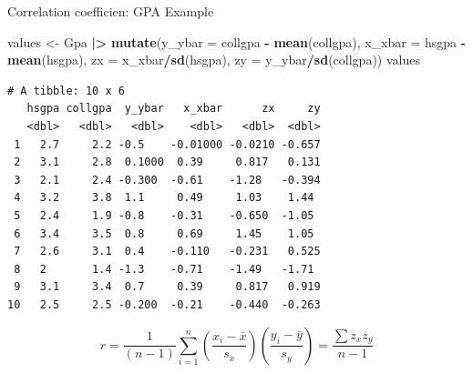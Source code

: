 \documentclass[
  ignorenonframetext,
]{beamer}
\newenvironment{Shaded}{\begin{snugshade}}{\end{snugshade}}
\newcommand{\AttributeTok}[1]{\textcolor[rgb]{0.13,0.29,0.53}{#1}}
\newcommand{\FunctionTok}[1]{\textcolor[rgb]{0.13,0.29,0.53}{\textbf{#1}}}
\newcommand{\NormalTok}[1]{#1}
\newcommand{\OtherTok}[1]{\textcolor[rgb]{0.56,0.35,0.01}{#1}}
\newcommand{\SpecialCharTok}[1]{\textcolor[rgb]{0.81,0.36,0.00}{\textbf{#1}}}
\begin{document}
\begin{frame}[fragile]{Correlation coefficien: GPA Example}
\label{correlation-coefficien-gpa-example-1}
\small

\begin{Shaded}
\begin{Highlighting}[]
\NormalTok{values }\OtherTok{\textless{}{-}}\NormalTok{ Gpa }\SpecialCharTok{|\textgreater{}} 
  \FunctionTok{mutate}\NormalTok{(}\AttributeTok{y\_ybar =}\NormalTok{ collgpa }\SpecialCharTok{{-}} \FunctionTok{mean}\NormalTok{(collgpa), }
         \AttributeTok{x\_xbar =}\NormalTok{ hsgpa }\SpecialCharTok{{-}} \FunctionTok{mean}\NormalTok{(hsgpa),}
         \AttributeTok{zx =}\NormalTok{ x\_xbar}\SpecialCharTok{/}\FunctionTok{sd}\NormalTok{(hsgpa), }\AttributeTok{zy =}\NormalTok{ y\_ybar}\SpecialCharTok{/}\FunctionTok{sd}\NormalTok{(collgpa))}
\NormalTok{values}
\end{Highlighting}
\end{Shaded}

\begin{verbatim}
# A tibble: 10 x 6
   hsgpa collgpa  y_ybar   x_xbar      zx     zy
   <dbl>   <dbl>   <dbl>    <dbl>   <dbl>  <dbl>
 1   2.7     2.2 -0.5    -0.01000 -0.0210 -0.657
 2   3.1     2.8  0.1000  0.39     0.817   0.131
 3   2.1     2.4 -0.300  -0.61    -1.28   -0.394
 4   3.2     3.8  1.1     0.49     1.03    1.44 
 5   2.4     1.9 -0.8    -0.31    -0.650  -1.05 
 6   3.4     3.5  0.8     0.69     1.45    1.05 
 7   2.6     3.1  0.4    -0.110   -0.231   0.525
 8   2       1.4 -1.3    -0.71    -1.49   -1.71 
 9   3.1     3.4  0.7     0.39     0.817   0.919
10   2.5     2.5 -0.200  -0.21    -0.440  -0.263
\end{verbatim}

\normalsize

\[r=\frac{1}{(n-1)}\sum_{i=1}^n \left(\frac{x_i-\bar{x}}{s_x}\right)\left(\frac{y_i-\bar{y}}{s_y}\right)=\frac{\sum z_x z_y}{n-1}\]
\end{frame}
\end{document}
